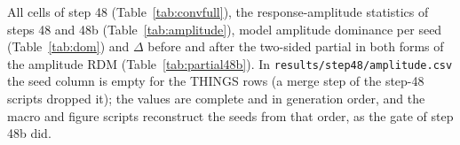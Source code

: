 All cells of step 48 (Table~\ref{tab:convfull}), the response-amplitude statistics of steps 48 and 48b
(Table~\ref{tab:amplitude}), model amplitude dominance per seed (Table~\ref{tab:dom}) and $\Delta$ before
and after the two-sided partial in both forms of the amplitude RDM (Table~\ref{tab:partial48b}). In
\texttt{results/step48/amplitude.csv} the seed column is empty for the THINGS rows (a merge step of the
step-48 scripts dropped it); the values are complete and in generation order, and the macro and figure
scripts reconstruct the seeds from that order, as the gate of step 48b did.





